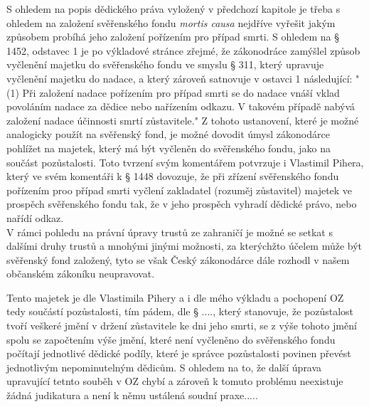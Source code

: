 \documentclass{article}
\begin{document}
S ohledem na popis dědického práva vyložený v předchozí kapitole je třeba s ohledem na založení svěřenského fondu \textit{mortis causa} nejdříve vyřešit jakým způsobem probíhá jeho založení pořízením pro případ smrti. S ohledem na § 1452, odstavec 1 je po výkladové stránce zřejmé, že zákonodráce zamýšlel způsob vyčlenění majetku do svěřenského fondu ve smyslu § 311, který upravuje vyčlenění majetku do nadace, a který zároveň satnovuje v ostavci 1 následující: "(1) Při založení nadace pořízením pro případ smrti se do nadace vnáší vklad povoláním nadace za dědice nebo nařízením odkazu. V takovém případě nabývá založení nadace účinnosti smrtí zůstavitele." Z tohoto ustanovení, které je možné analogicky použít na svěřenský fond, je možné dovodit úmysl zákonodárce pohlížet na majetek, který má být vyčleněn do svěřenského fondu, jako na součást pozůstalosti. Toto tvrzení svým komentářem potvrzuje i Vlastimil Pihera, který ve svém komentáři k § 1448 dovozuje, že při zřízení svěřenského fondu pořízením proo případ smrti vyčlení zakladatel (rozuměj zůstavitel) majetek ve prospěch svěřenského fondu tak, že v jeho prospěch vyhradí dědické právo, nebo nařídí odkaz. \\


V rámci pohledu na právní úpravy trustů ze zahraničí je možné se setkat s dalšími druhy trustů a mnohými jinými možnosti, za kterýchžto účelem může být svěřenský fond založený, tyto se však Český zákonodárce dále rozhodl v našem občanském zákoníku neupravovat.

\newpage
\thispagestyle{smallertextinheader}

Tento majetek je dle Vlastimila Pihery a i dle mého výkladu a pochopení OZ tedy součástí pozůstalosti, tím pádem, dle § ...., který stanovuje, že pozůstalost tvoří veškeré jmění v držení zůstavitele ke dni jeho smrti, se z výše tohoto jmění spolu se započtením výše jmění, které není vyčleněno do svěřenského fondu počítají jednotlivé dědické podíly, které je správce pozůstalosti povinen převést jednotlivým nepominutelným dědicům. S ohledem na to, že další úprava upravující tetnto souběh v OZ chybí a zároveň k tomuto problému neexistuje žádná judikatura a není k němu ustálená soudní praxe.....
\end{document}
